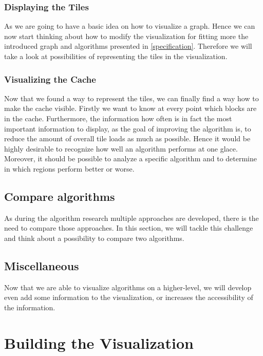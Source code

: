 \documentclass
[
	paper = a4,
    pagesize,
	12 pt,
	oneside,                       %
    open = right,
	DIV = calc,
	BCOR = 0 mm,                   %
	bibtotoc
]
{scrbook}
\begin{document}
\subsection{Displaying the Tiles}

As we are going to have a basic idea on how to visualize a graph.
Hence we can now start thinking about how to modify the visualization for fitting more the introduced graph and algorithms presented in \cref{specification}.
Therefore we will take a look at possibilities of representing the tiles in the visualization.


\subsection{Visualizing the Cache}

Now that we found a way to represent the tiles, we can finally find a way how to make the cache visible.
Firstly we want to know at every point which blocks are in the cache.
Furthermore, the information how often is in fact the most important information to display, as the goal of improving the algorithm is, to reduce the amount of overall tile loads as much as possible.
Hence it would be highly desirable to recognize how well an algorithm performs at one glace.
Moreover, it should be possible to analyze a specific algorithm and to determine in which regions perform better or worse.


\section{Compare algorithms}

As during the algorithm research multiple approaches are developed, there is the need to compare those approaches.
In this section, we will tackle this challenge and think about a possibility to compare two algorithms.


\section{Miscellaneous}

Now that we are able to visualize algorithms on a higher-level, we will develop even add some information to the visualization, or increases the accessibility of the information.



\chapter{Building the Visualization} \label{main}
\end{document}
